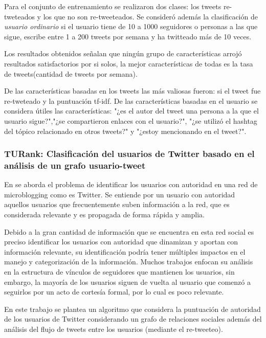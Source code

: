 Para el conjunto de entrenamiento se realizaron dos clases: los tweets re-tweteados y los que no son re-tweeteados. Se consideró además la clasificación de \emph{usuario ordinario} si el usuario tiene de 10 a 1000 seguidores o personas a las que sigue, escribe entre 1 a 200 tweets por semana y ha twitteado más de 10 veces.

Los resultados obtenidos señalan que ningún grupo de características arrojó resultados satisfactorios por si solos, la mejor características de todas es la tasa de tweets(cantidad de tweets por semana). 

De las características basadas en los tweets las más valiosas fueron: si el tweet fue re-tweteado y la puntuación tf-idf. De las características basadas en  el usuario se considera útiles las características: "¿es el autor del tweet una persona a la que el usuario sigue?","¿se compartieron enlaces con el usuario?", "¿se utilizó el hashtag del tópico relacionado en otros tweets?" y "¿estoy mencionando en el tweet?".

\subsubsection{TURank: Clasificación del usuarios de Twitter basado en el análisis de un grafo usuario-tweet}

 En \cite{Yamaguchi:2010:TTU:1991336.1991364} se aborda el problema de identificar los usuarios con autoridad en una red de microblogging como es Twitter. Se entiende por un usuario con autoridad aquellos usuarios que frecuentemente suben información a la red, que es considerada relevante y es propagada de forma rápida y amplia.
 
 Debido a la gran cantidad de información que se encuentra en esta red social es preciso identificar los usuarios con autoridad que dinamizan y aportan con información relevante, su identificación podría tener múltiples impactos en el manejo y categorización de la información. Muchos trabajos enfocan su análisis en la estructura de vínculos de seguidores que mantienen los usuarios, sin embargo, la mayoría de los usuarios siguen de vuelta al usuario que comenzó a seguirlos por un acto de cortesía formal, por lo cual es poco relevante.

En este trabajo se plantea un algoritmo que considera la puntuación de autoridad de los usuarios de Twitter considerando un grafo de relaciones sociales además del análisis del flujo de tweets entre los usuarios (mediante el re-tweeteo).


